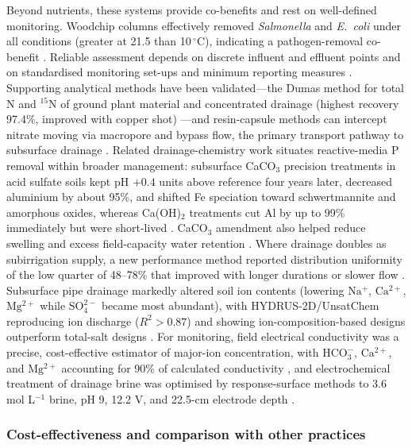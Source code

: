 Beyond nutrients, these systems provide co-benefits and rest on well-defined monitoring. Woodchip columns effectively removed \textit{Salmonella} and \textit{E.\ coli} under all conditions (greater at 21.5 than 10\,$^{\circ}$C), indicating a pathogen-removal co-benefit \parencite{Soupir2018}. Reliable assessment depends on discrete influent and effluent points \parencite{Easton2019} and on standardised monitoring set-ups and minimum reporting measures \parencite{Christianson2021}. Supporting analytical methods have been validated---the Dumas method for total N and $^{15}$N of ground plant material and concentrated drainage (highest recovery 97.4\%, improved with copper shot) \parencite{Schindler1999}---and resin-capsule methods can intercept nitrate moving via macropore and bypass flow, the primary transport pathway to subsurface drainage \parencite{Pampolino2000}. Related drainage-chemistry work situates reactive-media P removal within broader management: subsurface CaCO$_3$ precision treatments in acid sulfate soils kept pH $+0.4$ units above reference four years later, decreased aluminium by about 95\%, and shifted Fe speciation toward schwertmannite and amorphous oxides, whereas Ca(OH)$_2$ treatments cut Al by up to 99\% immediately but were short-lived \parencite{Dalhem2019}. CaCO$_3$ amendment also helped reduce swelling and excess field-capacity water retention \parencite{He2015}. Where drainage doubles as subirrigation supply, a new performance method reported distribution uniformity of the low quarter of 48--78\% that improved with longer durations or slower flow \parencite{Jia2017}. Subsurface pipe drainage markedly altered soil ion contents (lowering $\mathrm{Na^+}$, $\mathrm{Ca^{2+}}$, $\mathrm{Mg^{2+}}$ while $\mathrm{SO_4^{2-}}$ became most abundant), with HYDRUS-2D/UnsatChem reproducing ion discharge ($R^2 > 0.87$) and showing ion-composition-based designs outperform total-salt designs \parencite{Liu2025b}. For monitoring, field electrical conductivity was a precise, cost-effective estimator of major-ion concentration, with $\mathrm{HCO_3^-}$, $\mathrm{Ca^{2+}}$, and $\mathrm{Mg^{2+}}$ accounting for 90\% of calculated conductivity \parencite{Zimmerman2017}, and electrochemical treatment of drainage brine was optimised by response-surface methods to 3.6 mol L$^{-1}$ brine, pH 9, 12.2 V, and 22.5-cm electrode depth \parencite{Yang2023}.

\subsubsection{Cost-effectiveness and comparison with other practices}

